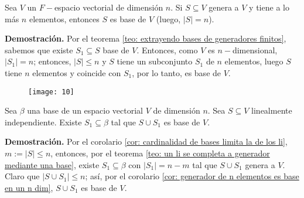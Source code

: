 \begin{cor}
	\label{cor: generador de n elementos es base en un n dim}
Sea $V$ un $F-$espacio vectorial de dimensión $n$. Si
$S \subseteq V$ genera a $V$ y tiene a lo más $n$ elementos, entonces $S$
es base de $V$ (luego, $|S| = n$).
\end{cor}
\noindent
\textbf{Demostración.}
Por el teorema 
\ref{teo: extrayendo bases de generadores finitos}, 
sabemos que existe $S_{1} \subseteq S$ base de $V$.
Entonces, como $V$ es $n-$dimensional,
$|S_{1}| = n$; entonces, $|S| \leq n$ y $S$ tiene 
un subconjunto $S_{1}$ de $n$ elementos, luego $S$ tiene $n$
elementos y coincide con $S_{1}$, 
por lo tanto, es base de $V$.
\QEDB
\vspace{0.2cm}

\begin{figure}[H]
	\centering
	\texttt{[image: 10]} 
\end{figure}	

\begin{cor}
	\label{cor: extendiendo l.i. a base finita}
Sea $\beta$ una base de un espacio vectorial $V$ de dimensión
$n$. Sea $S \subseteq V$ linealmente independiente. Existe
$S_{1} \subseteq \beta$ tal que $S \cup S_{1}$ es base de $V$.
\end{cor}
\noindent
\textbf{Demostración.}
Por el corolario \ref{cor: cardinalidad de bases limita la de los li},
$m := |S| \leq n$, entonces, por el teorema 
\ref{teo: un li se completa a generador mediante una base},
existe $S_{1} \subseteq \beta$ con 
$|S_{1}| = n-m$ tal que $S \cup S_{1}$ genera a $V$.
Claro que $|S \cup S_{1}| \leq n$; así, por el corolario 
\ref{cor: generador de n elementos es base en un n dim}, 
$S \cup S_{1}$ es base de $V$.
\QEDB
\vspace{0.2cm}

